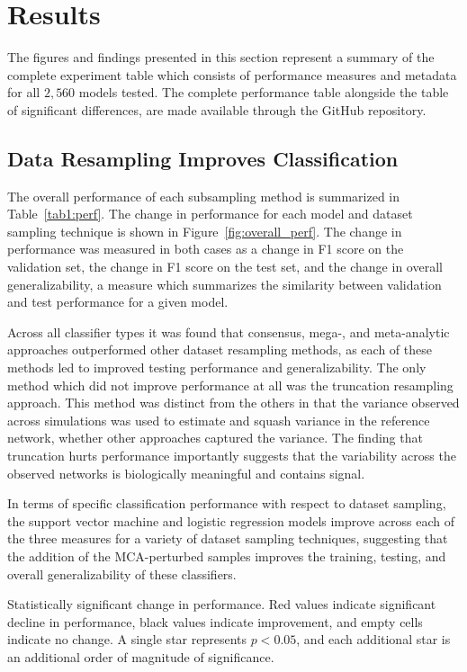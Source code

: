 \documentclass[10pt]{SelfArx} %
\begin{document}
\section*{Results}

The figures and findings presented in this section represent a summary of the complete experiment table which consists
of performance measures and metadata for all $2,560$ models tested. The complete performance table alongside the table
of significant differences, are made available through the GitHub repository.

\subsection*{Data Resampling Improves Classification}

The overall performance of each subsampling method is summarized in Table~\ref{tab1:perf}. The change in performance
for each model and dataset sampling technique is shown in Figure~\ref{fig:overall_perf}. The change in performance was
measured in both cases as a change in F1 score on the validation set, the change in F1 score on the test set, and the
change in overall generalizability, a measure which summarizes the similarity between validation and test performance
for a given model. 

Across all classifier types it was found that consensus, mega-, and meta-analytic approaches outperformed other dataset
resampling methods, as each of these methods led to improved testing performance and generalizability. The only method
which did not improve performance at all was the truncation resampling approach. This method was distinct from the
others in that the variance observed across simulations was used to estimate and squash variance in the reference
network, whether other approaches captured the variance. The finding that truncation hurts performance importantly
suggests that the variability across the observed networks is biologically meaningful and contains signal.

In terms of specific classification performance with respect to dataset sampling, the support vector machine and
logistic regression models improve across each of the three measures for a variety of dataset sampling techniques,
suggesting that the addition of the MCA-perturbed samples improves the training, testing, and overall generalizability
of these classifiers.

\begin{table}[b!]
\centering
\caption{Statistically significant change in performance. Red values indicate significant
decline in performance, black values indicate improvement, and empty cells indicate no change. A single star
represents $p < 0.05$, and each additional star is an additional order of magnitude of significance.}
\label{tab1:perf}
\small

\end{table}
\end{document}
